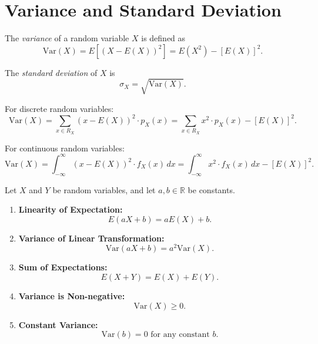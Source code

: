 \section{Variance and Standard Deviation}

\begin{definition}[Variance]
The \emph{variance} of a random variable \(X\) is defined as
\[
\text{Var}(X) = E\left[(X - E(X))^2\right] = E(X^2) - [E(X)]^2.
\]
\end{definition}

\begin{definition}
The \emph{standard deviation} of \(X\) is
\[
\sigma_X = \sqrt{\text{Var}(X)}.
\]
\end{definition}

\begin{remark}
For discrete random variables:
\[
\text{Var}(X) = \sum_{x \in R_X} (x - E(X))^2 \cdot p_X(x) = \sum_{x \in R_X} x^2 \cdot p_X(x) - [E(X)]^2.
\]

For continuous random variables:
\[
\text{Var}(X) = \int_{-\infty}^{\infty} (x - E(X))^2 \cdot f_X(x) \, dx = \int_{-\infty}^{\infty} x^2 \cdot f_X(x) \, dx - [E(X)]^2.
\]
\end{remark}

\begin{theorem}
Let \(X\) and \(Y\) be random variables, and let \(a, b \in \mathbb{R}\) be constants.

\begin{enumerate}[label=(\roman*)]
    \item \textbf{Linearity of Expectation:}
    \[
    E(aX + b) = aE(X) + b.
    \]
    
    \item \textbf{Variance of Linear Transformation:}
    \[
    \text{Var}(aX + b) = a^2 \text{Var}(X).
    \]
    
    \item \textbf{Sum of Expectations:}
    \[
    E(X + Y) = E(X) + E(Y).
    \]
    
    \item \textbf{Variance is Non-negative:}
    \[
    \text{Var}(X) \ge 0.
    \]
    
    \item \textbf{Constant Variance:}
    \[
    \text{Var}(b) = 0 \text{ for any constant } b.
    \]
\end{enumerate}
\end{theorem}

